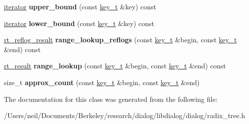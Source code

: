 \begin{DoxyCompactItemize}
\item 
\mbox{\label{classdialog_1_1index_1_1radix__tree_a19e7ca79ca0a850b8285cc298e6f13f0}} 
\hyperlink{classdialog_1_1index_1_1rt__reflog__it}{iterator} {\bfseries upper\+\_\+bound} (const \hyperlink{classdialog_1_1byte__string}{key\+\_\+t} \&key) const
\item 
\mbox{\label{classdialog_1_1index_1_1radix__tree_ab7abcb24a75757d0986ef4950008bdda}} 
\hyperlink{classdialog_1_1index_1_1rt__reflog__it}{iterator} {\bfseries lower\+\_\+bound} (const \hyperlink{classdialog_1_1byte__string}{key\+\_\+t} \&key) const
\item 
\mbox{\label{classdialog_1_1index_1_1radix__tree_a70678f369aede02f2585c76720197916}} 
\hyperlink{classdialog_1_1index_1_1rt__reflog__range__result}{rt\+\_\+reflog\+\_\+result} {\bfseries range\+\_\+lookup\+\_\+reflogs} (const \hyperlink{classdialog_1_1byte__string}{key\+\_\+t} \&begin, const \hyperlink{classdialog_1_1byte__string}{key\+\_\+t} \&end) const
\item 
\mbox{\label{classdialog_1_1index_1_1radix__tree_a914163136bf6c3330c922855b93955f2}} 
\hyperlink{classflattened__container}{rt\+\_\+result} {\bfseries range\+\_\+lookup} (const \hyperlink{classdialog_1_1byte__string}{key\+\_\+t} \&begin, const \hyperlink{classdialog_1_1byte__string}{key\+\_\+t} \&end) const
\item 
\mbox{\label{classdialog_1_1index_1_1radix__tree_ab5f77a03120aed99761c005677bcda04}} 
size\+\_\+t {\bfseries approx\+\_\+count} (const \hyperlink{classdialog_1_1byte__string}{key\+\_\+t} \&begin, const \hyperlink{classdialog_1_1byte__string}{key\+\_\+t} \&end)
\end{DoxyCompactItemize}


The documentation for this class was generated from the following file\+:\begin{DoxyCompactItemize}
\item 
/\+Users/neil/\+Documents/\+Berkeley/research/dialog/libdialog/dialog/radix\+\_\+tree.\+h\end{DoxyCompactItemize}
